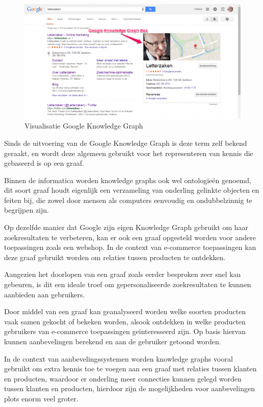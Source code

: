 \begin{figure} [ht]
	\centering
	\includegraphics[width=\linewidth]{img/Google_Knowledge_Graph.png}
	\caption[Visualisatie Google Knowledge Graph]{Visualisatie Google Knowledge Graph}
	\label{fig:GoogleKnowledgeGraphVis}
\end{figure}


Sinds de uitvoering van de Google Knowledge Graph is deze term zelf bekend geraakt, en wordt deze algemeen gebruikt voor het representeren van kennis die gebaseerd is op een graaf.

Binnen de informatica worden knowledge graphs ook wel ontologieën genoemd, dit soort graaf houdt eigenlijk een verzameling van onderling gelinkte objecten en feiten bij, die zowel door mensen als computers eenvoudig en ondubbelzinnig te begrijpen zijn.   

Op dezelfde manier dat Google zijn eigen Knowledge Graph gebruikt om haar zoekresultaten te verbeteren, kan er ook een graaf opgesteld worden voor andere toepassingen zoals een webshop. In de context van e-commerce toepassingen kan deze graaf gebruikt worden om relaties tussen producten te ontdekken. 

Aangezien het doorlopen van een graaf zoals eerder besproken zeer snel kan gebeuren, is dit een ideale troef om gepersonaliseerde zoekresultaten te kunnen aanbieden aan gebruikers. \autocite{E-CommerceKnowledgeGraph}

Door middel van een graaf kan geanalyseerd worden welke soorten producten vaak samen gekocht of bekeken worden, alsook ontdekken in welke producten gebruikers van e-commerce toepassingen geïnteresseerd zijn. Op basis hiervan kunnen aanbevelingen berekend en aan de gebruiker getoond worden. 

In de context van aanbevelingssystemen worden knowledge graphs vooral gebruikt om extra kennis toe te voegen aan een graaf met relaties tussen klanten en producten, waardoor er onderling meer connecties kunnen gelegd worden tussen klanten en producten, hierdoor zijn de mogelijkheden voor aanbevelingen plots enorm veel groter.
 
